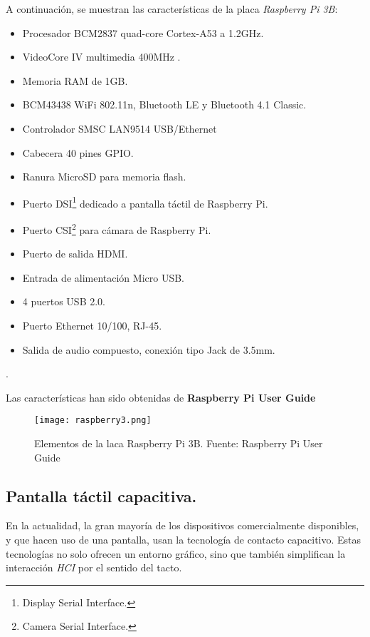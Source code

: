 A continuación, se muestran las características de la placa \emph{Raspberry Pi 3B}:
\begin{itemize}
\item Procesador BCM2837 quad-core Cortex-A53 a 1.2GHz.
\item VideoCore IV multimedia 400MHz . 
\item Memoria RAM de 1GB.
\item BCM43438 WiFi 802.11n, Bluetooth LE y Bluetooth 4.1 Classic.
\item Controlador SMSC LAN9514 USB/Ethernet
\item Cabecera 40 pines GPIO.
\item Ranura MicroSD para memoria flash.
\item Puerto DSI\footnote{Display Serial Interface.} dedicado a pantalla táctil de Raspberry Pi.
\item Puerto CSI\footnote{Camera Serial Interface.} para cámara de Raspberry Pi.
\item Puerto de salida HDMI.
\item Entrada de alimentación Micro USB.
\item 4 puertos USB 2.0.
\item Puerto Ethernet 10/100, RJ-45.
\item Salida de audio compuesto, conexión tipo Jack de 3.5mm.
\end{itemize}.

Las características han sido obtenidas de \textbf{Raspberry Pi User Guide ~\cite{Upton}}

\begin{figure}[!h]
\begin{center}
\texttt{[image: raspberry3.png]}
\caption{Elementos de la laca Raspberry Pi 3B. Fuente: Raspberry Pi User Guide ~\cite{Upton}}
\label{fig:raspberry3}
\end{center}
\end{figure}





\subsection{Pantalla táctil capacitiva.}
\label{subsubs:pantalla7}
En la actualidad, la gran mayoría de los dispositivos comercialmente disponibles, y que hacen uso de una pantalla, usan la tecnología de contacto capacitivo. Estas tecnologías no solo ofrecen un entorno gráfico, sino que también simplifican la interacción \emph{HCI} por el sentido del tacto.\

